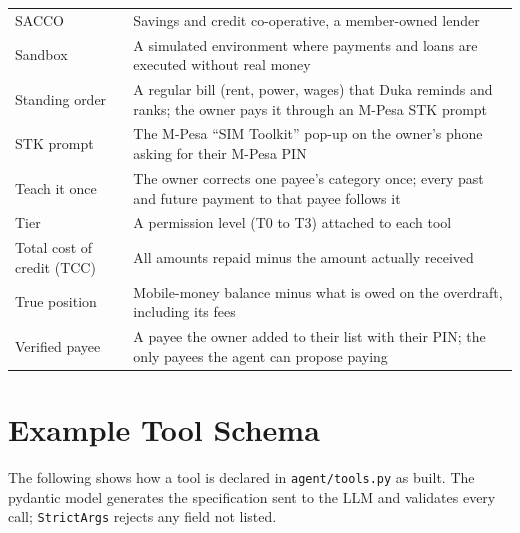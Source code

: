 \documentclass[10pt,a4paper]{article}
\newcommand{\code}[1]{\texttt{\small #1}}
\begin{document}
\begin{center}
\begin{tabularx}{\textwidth}{@{}p{3.8cm}Y@{}}
SACCO & Savings and credit co-operative, a member-owned lender\\
Sandbox & A simulated environment where payments and loans are executed without real money\\
Standing order & A regular bill (rent, power, wages) that Duka reminds and ranks; the owner pays it through an M-Pesa STK prompt\\
STK prompt & The M-Pesa ``SIM Toolkit'' pop-up on the owner's phone asking for their M-Pesa PIN\\
Teach it once & The owner corrects one payee's category once; every past and future payment to that payee follows it\\
Tier & A permission level (T0 to T3) attached to each tool\\
Total cost of credit (TCC) & All amounts repaid minus the amount actually received\\
True position & Mobile-money balance minus what is owed on the overdraft, including its fees\\
Verified payee & A payee the owner added to their list with their PIN; the only payees the agent can propose paying\\
\bottomrule
\end{tabularx}
\end{center}

\section{Example Tool Schema}
The following shows how a tool is declared in \code{agent/tools.py} as built. The pydantic model generates the specification sent to the LLM and validates every call; \code{StrictArgs} rejects any field not listed.
\end{document}
